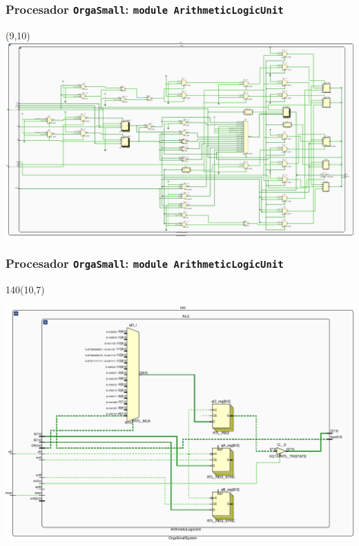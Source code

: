 \documentclass[aspectratio=169]{beamer}
\begin{document}
\begin{frame}[fragile,t]
    \frametitle{Procesador \texttt{OrgaSmall}: \texttt{module ArithmeticLogicUnit}}
    \begin{textblock}{80}(9,10)
    \includegraphics[scale=0.73]{pdf/schematicALU-crop.pdf}
    \end{textblock}
\end{frame}

\begin{frame}[fragile,t]
    \frametitle{Procesador \texttt{OrgaSmall}: \texttt{module ArithmeticLogicUnit}}
    \begin{textblock}{140}(10,7)
    \begin{center}
    \includegraphics[scale=0.62]{pdf/schematicALU2-crop.pdf}
    \end{center}
    \end{textblock}
\end{frame}
\end{document}
